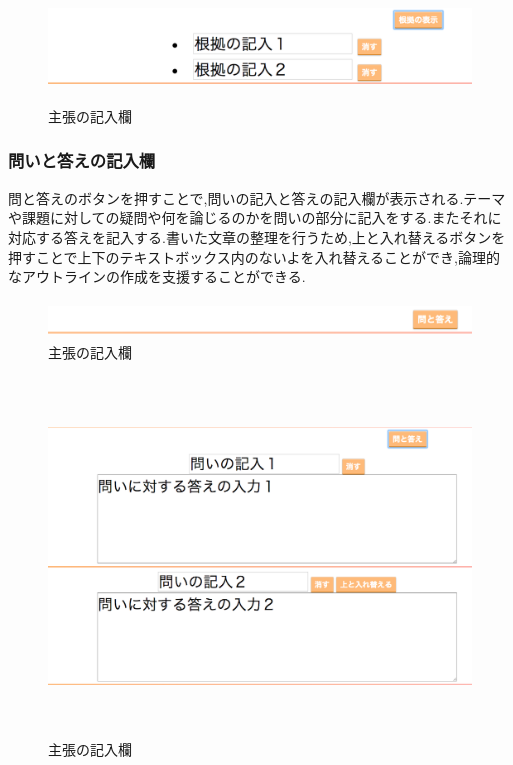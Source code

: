 \documentclass[a4j,12pt]{jarticle}
\begin{document}
\begin{figure}[h]
\begin{center}
 \includegraphics[clip,width=150mm,height=30mm]{03konkuo.png}
\end{center}
 \caption{主張の記入欄}
 \label{fig:k}
\end{figure}

\newpage
\subsubsection{問いと答えの記入欄}
問と答えのボタンを押すことで,問いの記入と答えの記入欄が表示される.テーマや課題に対しての疑問や何を論じるのかを問いの部分に記入をする.またそれに対応する答えを記入する.書いた文章の整理を行うため,上と入れ替えるボタンを押すことで上下のテキストボックス内のないよを入れ替えることができ,論理的なアウトラインの作成を支援することができる.

\begin{figure}[h]
\begin{center}
 \includegraphics[clip,width=150mm,height=10mm]{04qanda.png}
\end{center}
 \caption{主張の記入欄}
 \label{fig:l}
\end{figure}

\begin{figure}[h]
\begin{center}
 \includegraphics[clip,width=150mm,height=95mm]{05qanda.png}
\end{center}
 \caption{主張の記入欄}
 \label{fig:m}
\end{figure}
\newpage
\end{document}
